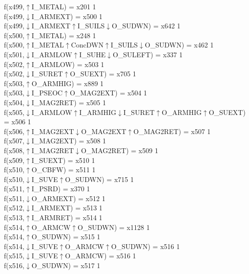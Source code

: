 f(x499,$\uparrow$I\_METAL) = x201 {1} \\
f(x499,$\downarrow$I\_ARMEXT) = x500 {1} \\
f(x499,$\downarrow$I\_ARMEXT$\uparrow$I\_SUILS$\downarrow$O\_SUDWN) = x642 {1} \\
f(x500,$\uparrow$I\_METAL) = x248 {1} \\
f(x500,$\uparrow$I\_METAL$\uparrow$ConcDWN$\uparrow$I\_SUILS$\downarrow$O\_SUDWN) = x462 {1} \\
f(x501,$\downarrow$I\_ARMLOW$\uparrow$I\_SUHE$\downarrow$O\_SULEFT) = x337 {1} \\
f(x502,$\uparrow$I\_ARMLOW) = x503 {1} \\
f(x502,$\downarrow$I\_SURET$\uparrow$O\_SUEXT) = x705 {1} \\
f(x503,$\uparrow$O\_ARMHIG) = x889 {1} \\
f(x503,$\downarrow$I\_PSEOC$\uparrow$O\_MAG2EXT) = x504 {1} \\
f(x504,$\downarrow$I\_MAG2RET) = x505 {1} \\
f(x505,$\downarrow$I\_ARMLOW$\uparrow$I\_ARMHIG$\downarrow$I\_SURET$\uparrow$O\_ARMHIG$\uparrow$O\_SUEXT) = x506 {1} \\
f(x506,$\uparrow$I\_MAG2EXT$\downarrow$O\_MAG2EXT$\uparrow$O\_MAG2RET) = x507 {1} \\
f(x507,$\downarrow$I\_MAG2EXT) = x508 {1} \\
f(x508,$\uparrow$I\_MAG2RET$\downarrow$O\_MAG2RET) = x509 {1} \\
f(x509,$\uparrow$I\_SUEXT) = x510 {1} \\
f(x510,$\uparrow$O\_CBFW) = x511 {1} \\
f(x510,$\downarrow$I\_SUVE$\uparrow$O\_SUDWN) = x715 {1} \\
f(x511,$\uparrow$I\_PSRD) = x370 {1} \\
f(x511,$\downarrow$O\_ARMEXT) = x512 {1} \\
f(x512,$\downarrow$I\_ARMEXT) = x513 {1} \\
f(x513,$\uparrow$I\_ARMRET) = x514 {1} \\
f(x514,$\uparrow$O\_ARMCW$\uparrow$O\_SUDWN) = x1128 {1} \\
f(x514,$\uparrow$O\_SUDWN) = x515 {1} \\
f(x514,$\downarrow$I\_SUVE$\uparrow$O\_ARMCW$\uparrow$O\_SUDWN) = x516 {1} \\
f(x515,$\downarrow$I\_SUVE$\uparrow$O\_ARMCW) = x516 {1} \\
f(x516,$\downarrow$O\_SUDWN) = x517 {1} \\

